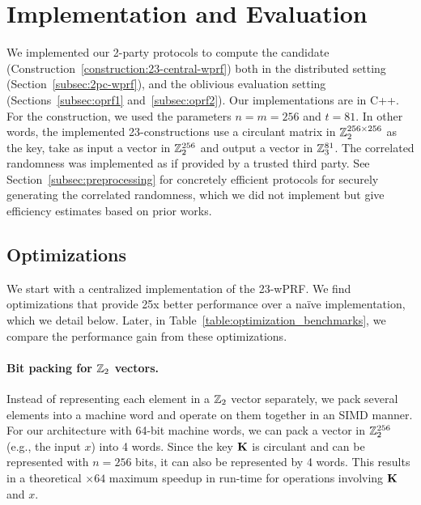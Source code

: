 
\newpage
\section{Implementation and Evaluation}
\label{sec:implementation_and_eval}
We implemented our 2-party protocols to compute the \ttwPRF candidate (Construction~\ref{construction:23-central-wprf}) both in the distributed setting (Section~\ref{subsec:2pc-wprf}), and the oblivious evaluation setting (Sections~\ref{subsec:oprf1} and~\ref{subsec:oprf2}). Our implementations are in C++. For the \ttwPRF construction, we used the parameters $n = m = 256$ and $t = 81$. In other words, the implemented 23-constructions use a circulant matrix in $\mathbb{Z}_2^{256 \times 256}$ as the key, take as input a vector in $\mathbb{Z}_2^{256}$ and output a vector in $\mathbb{Z}_3^{81}$. The correlated randomness was implemented as if provided by a trusted third party.  See Section~\ref{subsec:preprocessing} for concretely efficient protocols for securely generating the correlated randomness, which we did not implement but give efficiency estimates based on prior works. 

\subsection{Optimizations}
\label{subsec:implementation_opt}
We start with a centralized implementation of the 23-wPRF. We find optimizations that provide 25x better performance over a na\"ive implementation, which we detail below. Later, in Table~\ref{table:optimization_benchmarks}, we compare the performance gain from these optimizations.

\paragraph{Bit packing for $\mathbb{Z}_2$ vectors.} 
Instead of representing each element in a $\mathbb{Z}_2$ vector separately, we pack several elements into a machine word and operate on them together in an SIMD manner. For our architecture with 64-bit machine words, we can pack a vector in $\mathbb{Z}_2^{256}$ (e.g., the input $x$) into 4 words. Since the key $\mat{K}$ is circulant and can be represented with $n=256$ bits, it can also be represented by 4 words. This results in a theoretical $\times64$ maximum speedup in run-time for operations involving $\mat{K}$ and $x$. 

